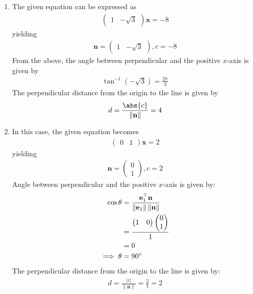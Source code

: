 \documentclass[12pt]{article}
\providecommand{\brak}[1]{\ensuremath{\left(#1\right)}}
\providecommand{\norm}[1]{\left\lVert#1\right\rVert}
\newcommand{\myvec}[1]{\ensuremath{\begin{pmatrix}#1\end{pmatrix}}}
\let\vec\mathbf
\begin{document}
\begin{enumerate}
\item The given equation can be expressed as
		\begin{align}
			\myvec{ 1 & -\sqrt{3}}\vec{x}= -8
			\end{align}
			yielding
\begin{align}
			\vec{n} = \myvec{ 1 & -\sqrt{3}}, c = -8
\end{align}
From the above, the	angle between perpendicular and the positive $x$-axis is given by
		\begin{align}
			\tan^{-1}\brak{-\sqrt{3}} = \frac{2\pi}{3}
		\end{align}
	The perpendicular distance from the origin to the line is given by
		\begin{align}
			d=\frac{\abs{c}}{\norm{\vec{n}}}=4
		\end{align}
\item In this case, the given equation becomes
          \begin{align}
		  \myvec{0 & 1}\vec{x} = 2
          \end{align}
	  yielding
                  \begin{align}
			  \vec{n}=\myvec{0\\1}, c = 2
                          \end{align}
          Angle between perpendicular and the positive $x$-axis is given by:
		\begin{align}  
\cos\theta&=\frac{\vec{e}_{1}^\top\vec{n}}{\norm{\vec{e}_{1}}\norm{\vec{n}}}\\
			&=\frac{\myvec{1&0}\myvec{0 \\ 1\\}}{1}\\
			&=0\\
			\implies	\theta&=90\degree       
                \end{align}      
 The perpendicular distance from the origin to the line is given by:    
                                      \begin{align}
					      d=\frac{|c|}{\norm{\vec{n}}}=\frac{2}{1}=2             
                  \end{align}
\begin{figure}[H]
\begin{center} 

\end{center}
\end{figure}
\end{enumerate}
\end{document}
